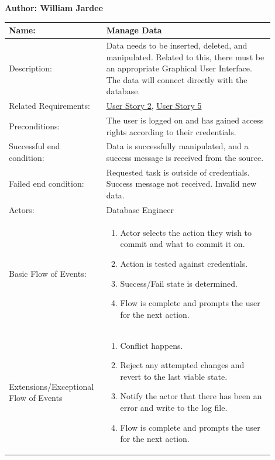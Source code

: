 \documentclass[11pt]{article}
\begin{document}
\begin{table}[!ht]
\begin{center}
\textbf{Author: William Jardee}
\vspace*{1em}

\begin{tabular}{p{0.30\linewidth}p{0.60\linewidth}}
	Name: & Manage Data\\\hline
	Description: & Data needs to be inserted, deleted, and manipulated. Related to this, there must be an appropriate Graphical User Interface. The data will connect directly with the database.\\\hline
	Related Requirements:& \hyperlink{us2}{User Story 2}, \hyperlink{us5}{User Story 5}\\\hline
	Preconditions:& The user is logged on and has gained access rights according to their credentials.\\\hline
	Successful end condition:& Data is successfully manipulated, and a success message is received from the source. \\\hline
	Failed end condition:& Requested task is outside of credentials. Success message not received. Invalid new data.\\\hline
	Actors:& Database Engineer\\\hline
	Basic Flow of Events: & \begin{enumerate}
	\item Actor selects the action they wish to commit and what to commit it on.
	\item Action is tested against credentials.
	\item Success/Fail state is determined.
	\item Flow is complete and prompts the user for the next action.
	\end{enumerate}\\\hline
	Extensions/Exceptional Flow of Events & \begin{enumerate}
	\item Conflict happens.
	\item Reject any attempted changes and revert to the last viable state.
	\item Notify the actor that there has been an error and write to the log file.
	\item Flow is complete and prompts the user for the next action.
	\end{enumerate}
\end{tabular}
\label{des:man_dat}	
\end{center}
\end{table}
\end{document}

